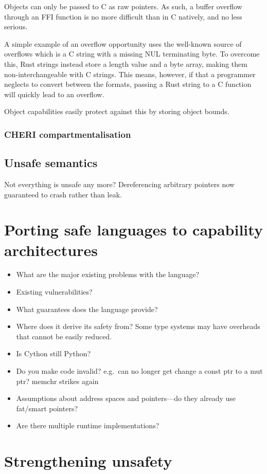 \documentclass[dissertation.tex]{subfiles}
\begin{document}
Objects can only be passed to C as raw pointers.
As such, a buffer overflow through an FFI function is no more difficult
than in C natively, and no less serious.

A simple example of an overflow opportunity uses the well-known source
of overflows which is a C string with a missing NUL terminating byte.
To overcome this, Rust strings instead store a length value and a byte
array, making them non-interchangeable with C strings.
This means, however, if that a programmer neglects to convert between
the formats, passing a Rust string to a C function will quickly lead to
an overflow.

Object capabilities easily protect against this by storing object
bounds.

\subsubsection{CHERI compartmentalisation}


\subsection{Unsafe semantics}
Not everything is unsafe any more? Dereferencing arbitrary pointers now
guaranteed to crash rather than leak.


\section{Porting safe languages to capability architectures}
\label{sec:eval-othersafe}

\begin{itemize}
    \item What are the major existing problems with the language?
    \item Existing vulnerabilities?
    \item What guarantees does the language provide?
    \item Where does it derive its safety from? Some type systems may
    have overheads that cannot be easily reduced.
    \item Is Cython still Python?
    \item Do you make code invalid? e.g.\ can no longer get change a
    const ptr to a mut ptr? memchr strikes again
    \item Assumptions about address spaces and pointers---do they
    already use fat/smart pointers?
    \item Are there multiple runtime implementations?
\end{itemize}


\section{Strengthening unsafety}
\label{sec:eval-betterunsafe}
\end{document}
